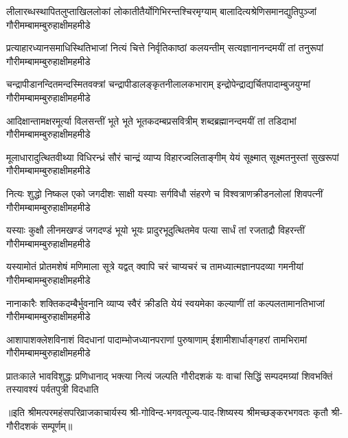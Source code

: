 


\fourlineindentedshloka
{लीलारब्धस्थापितलुप्ताखिललोकां}
{लोकातीतैर्योगिभिरन्तश्चिरमृग्याम्}
{बालादित्यश्रेणिसमानद्युतिपुञ्जां}
{गौरीमम्बामम्बुरुहाक्षीमहमीडे}

\fourlineindentedshloka
{प्रत्याहारध्यानसमाधिस्थितिभाजां}
{नित्यं चित्ते निर्वृतिकाष्ठां कलयन्तीम्}
{सत्यज्ञानानन्दमयीं तां तनुरूपां}
{गौरीमम्बामम्बुरुहाक्षीमहमीडे}

\fourlineindentedshloka
{चन्द्रापीडानन्दितमन्दस्मितवक्त्रां}
{चन्द्रापीडालङ्कृतनीलालकभाराम्}
{इन्द्रोपेन्द्राद्यर्चितपादाम्बुजयुग्मां}
{गौरीमम्बामम्बुरुहाक्षीमहमीडे}

\fourlineindentedshloka
{आदिक्षान्तामक्षरमूर्त्या विलसन्तीं}
{भूते भूते भूतकदम्बप्रसवित्रीम्}
{शब्दब्रह्मानन्दमयीं तां तडिदाभां}
{गौरीमम्बामम्बुरुहाक्षीमहमीडे}

\fourlineindentedshloka
{मूलाधारादुत्थितवीथ्या विधिरन्ध्रं}
{सौरं चान्द्रं व्याप्य विहारज्वलिताङ्गीम्}
{येयं सूक्ष्मात् सूक्ष्मतनुस्तां सुखरूपां}
{गौरीमम्बामम्बुरुहाक्षीमहमीडे}

\fourlineindentedshloka
{नित्यः शुद्धो निष्कल एको जगदीशः}
{साक्षी यस्याः सर्गविधौ संहरणे च}
{विश्वत्राणक्रीडनलोलां शिवपत्नीं}
{गौरीमम्बामम्बुरुहाक्षीमहमीडे}

\fourlineindentedshloka
{यस्याः कुक्षौ लीनमखण्डं जगदण्डं}
{भूयो भूयः प्रादुरभूदुत्थितमेव}
{पत्या सार्धं तां रजताद्रौ विहरन्तीं}
{गौरीमम्बामम्बुरुहाक्षीमहमीडे}

\fourlineindentedshloka
{यस्यामोतं प्रोतमशेषं मणिमाला}
{सूत्रे यद्वत् क्वापि चरं चाप्यचरं च}
{तामध्यात्मज्ञानपदव्या गमनीयां}
{गौरीमम्बामम्बुरुहाक्षीमहमीडे}

\fourlineindentedshloka
{नानाकारैः शक्तिकदम्बैर्भुवनानि}
{व्याप्य स्वैरं क्रीडति येयं स्वयमेका}
{कल्याणीं तां कल्पलतामानतिभाजां}
{गौरीमम्बामम्बुरुहाक्षीमहमीडे}

\fourlineindentedshloka
{आशापाशक्लेशविनाशं विदधानां}
{पादाम्भोजध्यानपराणां पुरुषाणाम्}
{ईशामीशार्धाङ्गहरां तामभिरामां}
{गौरीमम्बामम्बुरुहाक्षीमहमीडे}

\fourlineindentedshloka
{प्रातःकाले भावविशुद्धः प्रणिधानाद्}
{भक्त्या नित्यं जल्पति गौरीदशकं यः}
{वाचां सिद्धिं सम्पदमग्र्यां शिवभक्तिं}
{तस्यावश्यं पर्वतपुत्री विदधाति}

॥इति श्रीमत्परमहंसपरिव्राजकाचार्यस्य श्री-गोविन्द-भगवत्पूज्य-पाद-शिष्यस्य 
श्रीमच्छङ्करभगवतः कृतौ श्री-गौरीदशकं सम्पूर्णम्॥